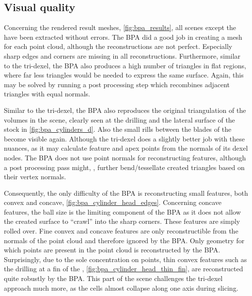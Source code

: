 \subsection{Visual quality}

Concerning the rendered result meshes, \cf \cref{fig:bpa_results}, all scenes except the \turbine have been extracted without errors.
The BPA did a good job in creating a mesh for each point cloud, although the reconstructions are not perfect.
Especially sharp edges and corners are missing in all reconstructions.
Furthermore, similar to the tri-dexel, the BPA also produces a high number of triangles in flat regions, where far less triangles would be needed to express the same surface.
Again, this may be solved by running a post processing step which recombines adjacent triangles with equal normals.

Similar to the tri-dexel, the BPA also reproduces the original triangulation of the volumes in the \cylindersd scene, clearly seen at the drilling and the lateral surface of the stock in \cref{fig:bpa_cylinders_d}.
Also the small rills between the blades of the \impeller become visible again.
Although the tri-dexel does a slightly better job with these nuances, as it may calculate feature and apex points from the normals of its dexel nodes.
The BPA does not use point normals for reconstructing features, although a post processing pass might, \eg, further bend/tessellate created triangles based on their vertex normals.

Consequently, the only difficulty of the BPA is reconstructing small features, both convex and concave, \cf \cref{fig:bpa_cylinder_head_edges}.
Concerning concave features, the ball size is the limiting component of the BPA as it does not allow the created surface to \enquote{crawl} into the sharp corners.
These features are simply rolled over.
Fine convex and concave features are only reconstructible from the normals of the point cloud and therefore ignored by the BPA.
Only geometry for which points are present in the point cloud is reconstructed by the BPA.
Surprisingly, due to the sole concentration on points, thin convex features such as the drilling at a fin of the \cylinderhead, \cf \cref{fig:bpa_cylinder_head_thin_fin}, are reconstructed quite robustly by the BPA.
This part of the scene challenges the tri-dexel approach much more, as the cells almost collapse along one axis during slicing.

